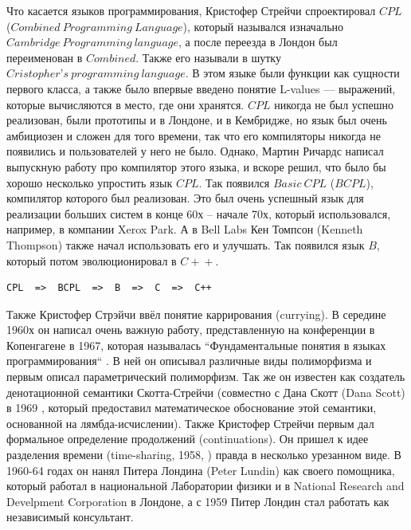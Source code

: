 \documentclass[14pt]{matmex-diploma-custom}
\begin{document}
Что касается языков программирования, Кристофер Стрейчи спроектировал $C\!PL$ ($Combined\ Programming\ Language$), который назывался изначально 
$Cambridge\ Programming\ language$, а после переезда в Лондон был переименован в $Combined$. Также его называли в шутку $Cristopher’s\ programming\ language$. В этом языке были функции как сущности первого класса, а также было впервые введено понятие L-values --- выражений, которые вычисляются в место, где они хранятся. $CPL$ никогда не был успешно реализован, были прототипы и в Лондоне, и в Кембридже, но язык был очень амбициозен и сложен для того времени, так что его компиляторы никогда не появились и пользователей у него не было. Однако, Мартин Ричардс написал выпускную работу про компилятор этого языка, и вскоре решил, что было бы хорошо несколько упростить язык $CPL$. Так появился $Basic\ CPL$ ($BCPL$)\cite{bcpl1}, компилятор которого был реализован. Это был очень успешный язык для реализации больших систем в конце 60х -- начале 70х, который использовался, например, в компании Xerox Park. А в Bell Labs Кен Томпсон (Kenneth Thompson) также начал использовать его и улучшать. Так появился язык $B$, который потом эволюционировал в $C\!+\!+$.

\begin{verbatim}
CPL  =>  BCPL  =>  B  =>  C  =>  C++
\end{verbatim}

Также Кристофер Стрэйчи ввёл понятие каррирования (currying). В середине 1960х он написал очень важную работу, представленную на конференции в Копенгагене в 1967, которая называлась  “Фундаментальные понятия в языках программирования“ \cite{strachey1}. В ней он описывал различные виды полиморфизма и первым описал параметрический полиморфизм. Так же он известен как создатель денотационной семантики Скотта-Стрейчи (совместно с Дана Скотт (Dana Scott) в 1969 \cite{scott1}, который предоставил математическое обоснование этой семантики, основанной на лямбда-исчислении). Также Кристофер Стрейчи первым дал формальное определение продолжений (continuations). Он пришел к идее разделения времени (time-sharing, 1958, \cite{strachey2}) правда в несколько урезанном виде. В 1960-64 годах он нанял Питера Лондина (Peter Lundin) как своего помощника, который работал в национальной Лаборатории физики и в National Research and Develpment Corporation в Лондоне, а с 1959 Питер Лондин стал работать как независимый консультант. 
\end{document}
